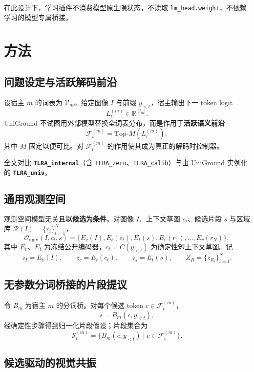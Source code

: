 在此设计下，学习插件不消费模型原生隐状态，不读取 \texttt{lm\_head.weight}，不依赖学习的模型专属桥接。

\section{方法}
\label{sec:method}

\subsection{问题设定与活跃解码前沿}

设宿主 $m$ 的词表为 $\mathcal{V}_m$。给定图像 $I$ 与前缀 $y_{<t}$，宿主输出下一 token logit
\[
L_t^{(m)} \in \mathbb{R}^{|\mathcal{V}_m|}.
\]
UniGround 不试图用外部模型替换全词表分布，而是作用于\textbf{活跃语义前沿}
\[
\mathcal{F}_t^{(m)} = \mathrm{Top}\text{-}M\!\left(L_t^{(m)}\right),
\]
其中 $M$ 固定以便可比。对 $\mathcal{F}_t^{(m)}$ 的作用使其成为真正的解码时控制器。

全文对比 \textbf{\texttt{TLRA\_internal}}（含 \texttt{TLRA\_zero}、\texttt{TLRA\_calib}）与由 UniGround 实例化的 \textbf{\texttt{TLRA\_univ}}。

\subsection{通用观测空间}

观测空间模型无关且\textbf{以候选为条件}。对图像 $I$、上下文草图 $c_t$、候选片段 $s$ 与区域库 $\mathcal{R}(I)=\{r_i\}_{i=1}^N$，
\[
\mathcal{O}_{\mathrm{univ}}(I, c_t, s)
= \{E_v(I), E_t(c_t), E_t(s), E_v(r_1), \dots, E_v(r_N)\},
\]
其中 $E_v$、$E_t$ 为冻结公开编码器，$c_t=C(y_{<t})$ 为确定性短上下文草图。记
\[
z_I = E_v(I), \qquad z_c = E_t(c_t), \qquad z_s = E_t(s), \qquad Z_R = \{z_{R_i}\}_{i=1}^N.
\]

\subsection{无参数分词桥接的片段提议}

令 $B_m$ 为宿主 $m$ 的分词桥。对每个候选 token $c \in \mathcal{F}_t^{(m)}$，
\[
s = B_m(c, y_{<t}),
\]
经确定性步骤得到归一化片段假设；片段集合为
\[
\mathcal{S}_t^{(m)} = \{ B_m(c, y_{<t}) \mid c \in \mathcal{F}_t^{(m)} \}.
\]

\subsection{候选驱动的视觉共振}


